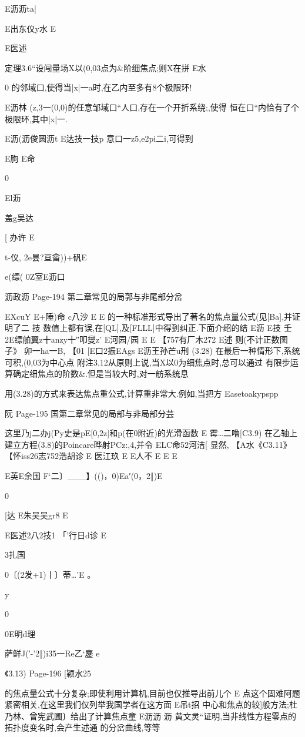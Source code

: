 {{{{{{{{{{{{{{{E沥沥ta|

E出东仪y水
E

E医述

定理3.6“设闯量场X以(0,03点为&阶细焦点;则X在拼
E水

0
的邻域口,使得当|x|一a时,在乙内至多有8个极限环!

E沥林
(z,3一(0,0)的任意邹域口“人口,存在一个开折系绕;,使得
恒在口“内恰有了个极限环,其中|x|一.

E沥(沥俊圆沥t
E达技一技p
意口一z5,e2pi二i,可得到

{E朐
E命

0

El沥

盖g吴达

[
办许
E

t-仪,
2e昙?亘畲))+矾E

e(缥(
0Z室E沥口

沥政沥
Page-194
第二章常见的局郭与非尾部分岔

EXcuY
E+陲)命
c八沙
E
E
的一种标准形式导出了著名的焦点量公式(见[Ba],并证明了二
技
数值上都有误,在[QL],及[FLLL]中得到纠正.下面介绍的结
E沥
E技
壬2E缥舶翼z十anzy十″叩燮z'
E河园/园
E
E
【757有厂木272
E述
则(不计正数图子》
卯一ha一B,
【01
[E口2振EAgs
E沥王孙芒u刑
(3.28)
在最后一种情形下,系统可积,(0,03为中心点
附注3.12从原则上说,当X以0为细焦点时,总可以通过
有限步运算确定细焦点的阶数&.但是当较大时,对一舫系统息

用(3.28)的方式来表达焦点重公式,计算重非常大.例如,当把方
Easetoakypspp

阮
Page-195
国第二章常见的局部与非局部分芸

这里乃j二办j(Py史是pE[0,2z]和p(在0附近)的光滑函数
E
霉…二噜[C3.9)
在乙轴上建立方程(3.8)的Poincare晔射PCz:,4,并令
ELC命52河洁[
显然,
【A水《C3.11》
【怀iss26志752浩胡诊
E
医江玖
E
E人不
E
E
E

E英E余国
F`二〕___】(()，0)Ea′(0，2‖)E

0

[达
E朱吴吴gr8
E

E医述2八2技1
「'行日d诊
E

3扎国

0〔(2发+1)丨〕蒂…'E
。

y

0

0E明d理

萨鲜J(′-'2‖)i35一Re乙`鏖
e

《3.13)
Page-196
[颖水25

的焦点量公式十分复杂;即使利用计算机,目前也仅推导出前儿个
E
点这个固难阿题紧密相关,在这里我们仅列举我国学者在这方面
E吊t招
中心和焦点的较]般方法;杜乃林、曾宪武圃〕给出了计算焦点童
E沥沥
沥
黄文灵“证明,当非线性方程零点的拓扑度变名时,会产生述通
的分岔曲线,等等

}}}}}}}}}}}}}}}}

